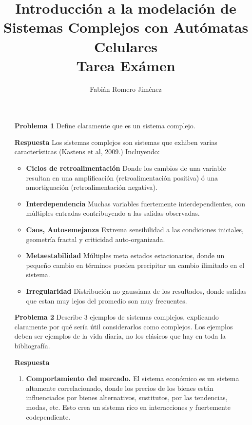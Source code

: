\documentclass{article}
\title{Introducción a la modelación de Sistemas Complejos con Autómatas Celulares\\ Tarea Exámen}
\author{Fabián Romero Jiménez}
\date{}
\begin{document}
\maketitle

\begin{enumerate}

\section{Conceptos Básicos}
\item[\bf{Problema 1}] Define claramente que es un sistema complejo.\\
\item[\bf{Respuesta}] Los sistemas complejos son sistemas que exhiben varias características (Kastens et al, 2009.)\cite{Kastens2009} Incluyendo: \\
\begin{itemize}
\item{\bf Ciclos de retroalimentación} Donde los cambios de una variable resultan en una amplificación (retroalimentación positiva) ó una amortiguación (retroalimentación negativa).
\item{\bf Interdependencia}  Muchas variables fuertemente interdependientes, con múltiples entradas contribuyendo a las salidas observadas. 
\item{\bf Caos, Autosemejanza} Extrema sensibilidad a las condiciones iniciales, geometría fractal y criticidad auto-organizada. 
\item{\bf Metaestabilidad} Múltiples meta estados estacionarios, donde un pequeño cambio en términos pueden precipitar un cambio ilimitado en el sistema.
\item{\bf Irregularidad}  Distribución no gaussiana de los resultados, donde salidas que estan muy lejos del promedio son muy frecuentes.
\end{itemize}

\item[\bf{Problema 2}] Describe 3 ejemplos de sistemas complejos, explicando claramente por
qué sería útil considerarlos como complejos. Los ejemplos deben ser ejemplos de la vida diaria, no los clásicos que hay en toda la bibliografía.
\item[\bf{Respuesta}]

\begin{enumerate}
\item {\bf Comportamiento del mercado.}
El sistema económico es un sistema altamente correlacionado, donde los precios de los bienes están influenciados por bienes alternativos, sustitutos, por las tendencias, modas, etc.
Esto crea un sistema rico en interacciones y fuertemente codependiente.


\end{enumerate}
\end{enumerate}
\end{document}

